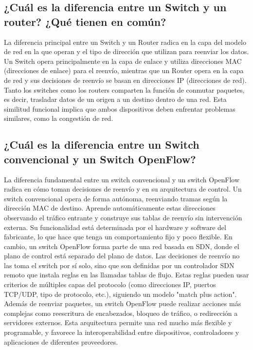 \documentclass[titlepage,a4paper]{article}
\begin{document}
    \subsection{¿Cuál es la diferencia entre un Switch y un router? ¿Qué tienen en común?}

    La diferencia principal entre un Switch y un Router radica en la capa del modelo de red en la que operan y el tipo de dirección que utilizan para reenviar los datos. Un Switch opera principalmente en la capa de enlace y utiliza direcciones MAC (direcciones de enlace) para el reenvío, mientras que un Router opera en la capa de red y sus decisiones de reenvío se basan en direcciones IP (direcciones de red). \\
    Tanto los switches como los routers comparten la función de conmutar paquetes, es decir, trasladar datos de un origen a un destino dentro de una red. Esta similitud funcional implica que ambos dispositivos deben enfrentar problemas similares, como la congestión de red.
    
    \subsection{¿Cuál es la diferencia entre un Switch convencional y un Switch OpenFlow?}

    La diferencia fundamental entre un switch convencional y un switch OpenFlow radica en cómo toman decisiones de reenvío y en su arquitectura de control. Un switch convencional opera de forma autónoma, reenviando tramas según la dirección MAC de destino. Aprende automáticamente estas direcciones observando el tráfico entrante y construye sus tablas de reenvío sin intervención externa. Su funcionalidad está determinada por el hardware y software del fabricante, lo que hace que tenga un comportamiento fijo y poco flexible. 
    En cambio, un switch OpenFlow forma parte de una red basada en SDN, donde el plano de control está separado del plano de datos. Las decisiones de reenvío no las toma el switch por sí solo, sino que son definidas por un controlador SDN remoto que instala reglas en las llamadas tablas de flujo. Estas reglas pueden usar criterios de múltiples capas del protocolo (como direcciones IP, puertos TCP/UDP, tipo de protocolo, etc.), siguiendo un modelo "match plus action". Además de reenviar paquetes, un switch OpenFlow puede realizar acciones más complejas como reescritura de encabezados, bloqueo de tráfico, o redirección a servidores externos. Esta arquitectura permite una red mucho más flexible y programable, y favorece la interoperabilidad entre dispositivos, controladores y aplicaciones de diferentes proveedores.
     
\end{document}
